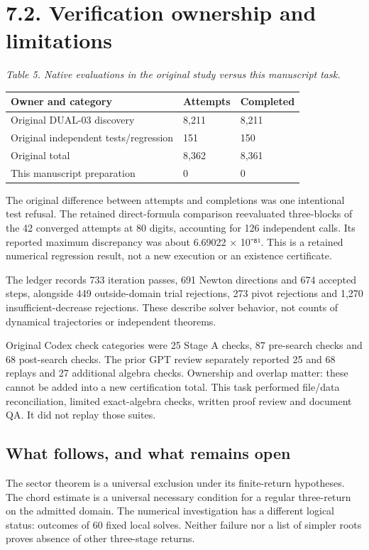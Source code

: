\documentclass[11pt,a4paper]{article}
\begin{document}
\section*{7.2. Verification ownership and limitations}
\par\textit{Table 5. Native evaluations in the original study versus this manuscript task.}\par
\begingroup\small
\begin{tabularx}{\textwidth}{XXX}
\toprule
Owner and category & Attempts & Completed\\\midrule
Original DUAL-03 discovery & 8,211 & 8,211\\
Original independent tests/regression & 151 & 150\\
Original total & 8,362 & 8,361\\
This manuscript preparation & 0 & 0\\
\bottomrule\end{tabularx}\endgroup\par
The original difference between attempts and completions was one intentional test refusal. The retained direct-formula comparison reevaluated three-blocks of the 42 converged attempts at 80 digits, accounting for 126 independent calls. Its reported maximum discrepancy was about 6.69022 × 10⁻⁸¹. This is a retained numerical regression result, not a new execution or an existence certificate. \cite{D03}

The ledger records 733 iteration passes, 691 Newton directions and 674 accepted steps, alongside 449 outside-domain trial rejections, 273 pivot rejections and 1,270 insufficient-decrease rejections. These describe solver behavior, not counts of dynamical trajectories or independent theorems.

Original Codex check categories were 25 Stage A checks, 87 pre-search checks and 68 post-search checks. The prior GPT review separately reported 25 and 68 replays and 27 additional algebra checks. Ownership and overlap matter: these cannot be added into a new certification total. This task performed file/data reconciliation, limited exact-algebra checks, written proof review and document QA. It did not replay those suites. \cite{REV03}

\subsection*{What follows, and what remains open}
The sector theorem is a universal exclusion under its finite-return hypotheses. The chord estimate is a universal necessary condition for a regular three-return on the admitted domain. The numerical investigation has a different logical status: outcomes of 60 fixed local solves. Neither failure nor a list of simpler roots proves absence of other three-stage returns.
\end{document}
